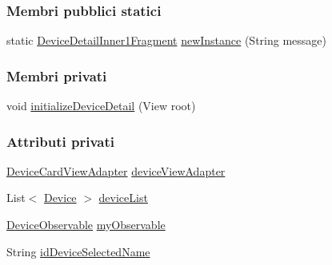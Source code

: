 \subsubsection*{Membri pubblici statici}
\begin{DoxyCompactItemize}
\item 
static \hyperlink{classit_1_1unibo_1_1torsello_1_1bluetoothpositioning_1_1fragment_1_1devicesObservers_1_1DeviceDetailInner1Fragment}{Device\+Detail\+Inner1\+Fragment} \hyperlink{classit_1_1unibo_1_1torsello_1_1bluetoothpositioning_1_1fragment_1_1devicesObservers_1_1DeviceDetailInner1Fragment_ac6fb79b1fec7580e8b96b414bfccd4d6_ac6fb79b1fec7580e8b96b414bfccd4d6}{new\+Instance} (String message)
\end{DoxyCompactItemize}
\subsubsection*{Membri privati}
\begin{DoxyCompactItemize}
\item 
void \hyperlink{classit_1_1unibo_1_1torsello_1_1bluetoothpositioning_1_1fragment_1_1devicesObservers_1_1DeviceDetailInner1Fragment_a60ac3d2537a790a04e49c72c3651ff25_a60ac3d2537a790a04e49c72c3651ff25}{initialize\+Device\+Detail} (View root)
\end{DoxyCompactItemize}
\subsubsection*{Attributi privati}
\begin{DoxyCompactItemize}
\item 
\hyperlink{classit_1_1unibo_1_1torsello_1_1bluetoothpositioning_1_1adapter_1_1DeviceCardViewAdapter}{Device\+Card\+View\+Adapter} \hyperlink{classit_1_1unibo_1_1torsello_1_1bluetoothpositioning_1_1fragment_1_1devicesObservers_1_1DeviceDetailInner1Fragment_a981ec49aae98052b414864feb742cbc5_a981ec49aae98052b414864feb742cbc5}{device\+View\+Adapter}
\item 
List$<$ \hyperlink{classit_1_1unibo_1_1torsello_1_1bluetoothpositioning_1_1model_1_1Device}{Device} $>$ \hyperlink{classit_1_1unibo_1_1torsello_1_1bluetoothpositioning_1_1fragment_1_1devicesObservers_1_1DeviceDetailInner1Fragment_ab9fa77b8ee7b5d5fef44743f6f5c8458_ab9fa77b8ee7b5d5fef44743f6f5c8458}{device\+List}
\item 
\hyperlink{classit_1_1unibo_1_1torsello_1_1bluetoothpositioning_1_1observables_1_1DeviceObservable}{Device\+Observable} \hyperlink{classit_1_1unibo_1_1torsello_1_1bluetoothpositioning_1_1fragment_1_1devicesObservers_1_1DeviceDetailInner1Fragment_a9d12c9cc89b3d578b42a79cf5fb1abe0_a9d12c9cc89b3d578b42a79cf5fb1abe0}{my\+Observable}
\item 
String \hyperlink{classit_1_1unibo_1_1torsello_1_1bluetoothpositioning_1_1fragment_1_1devicesObservers_1_1DeviceDetailInner1Fragment_a32265c6cbb2a0695e9c401d3f2acb9d3_a32265c6cbb2a0695e9c401d3f2acb9d3}{id\+Device\+Selected\+Name}
\end{DoxyCompactItemize}
